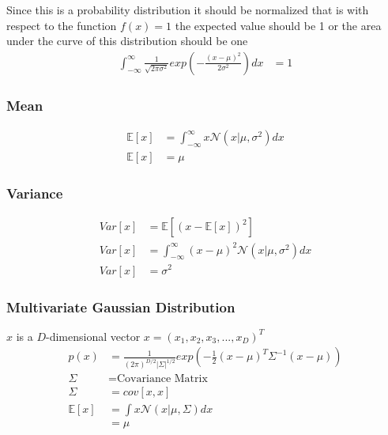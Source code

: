 \documentclass{article}
\begin{document}
Since this is a probability distribution it should be normalized that is with respect to the function $f(x) = 1$ the expected value should be 1 or the area under the curve of this distribution should be one
\begin{align*}
    \int_{-\infty}^{\infty} \frac{1}{\sqrt{2\pi\sigma^2}}exp(-\frac{(x-\mu)^2}{2\sigma^2})dx & = 1
\end{align*}
\subsubsection{Mean}
\begin{align*}
    \mathbb{E}[x] & = \int_{-\infty}^{\infty} x\mathcal{N}(x|\mu,\sigma^2)dx \\
    \mathbb{E}[x] & = \mu
\end{align*}
\subsubsection{Variance}
\begin{align*}
    Var[x] & = \mathbb{E}[(x-\mathbb{E}[x])^2]                                \\
    Var[x] & = \int_{-\infty}^{\infty} (x-\mu)^2\mathcal{N}(x|\mu,\sigma^2)dx \\
    Var[x] & = \sigma^2
\end{align*}
\subsubsection{Multivariate Gaussian Distribution}

$x$ is a $D$-dimensional vector $x = (x_1, x_2, x_3, ..., x_D)^ T$
\begin{align*}
    p(x)          & = \frac{1}{(2\pi)^{D/2}|\Sigma|^{1/2}}exp(-\frac{1}{2}(x-\mu)^T\Sigma^{-1}(x-\mu)) \\
    \Sigma        & = \text{Covariance Matrix}                                                         \\
    \Sigma        & = cov[x,x]                                                                         \\
    \mathbb{E}[x] & = \int x\mathcal{N}(x|\mu,\Sigma)dx                                                \\
                  & = \mu
\end{align*}
\end{document}
